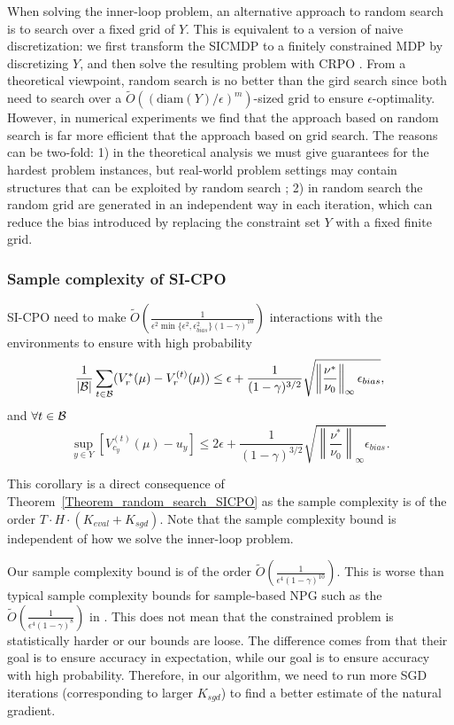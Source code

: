 \begin{remark}\label{Remark_random_search_vs_fixed_search}
    When solving the inner-loop problem, an alternative approach to random search is to search over a fixed grid of $Y$.
    This is equivalent to a version of naive discretization: we first transform the SICMDP to a finitely constrained MDP by discretizing $Y$, and then solve the resulting problem with CRPO \citep{xu2021crpo}.
    From a theoretical viewpoint, random search is no better than the gird search since both need to search over a $\widetilde{O}((\mathrm{diam}(Y)/\epsilon)^m)$-sized grid to ensure $\epsilon$-optimality.
    However, in numerical experiments we find that the approach based on random search is far more efficient that the approach based on grid search.
    The reasons can be two-fold: 1) in the theoretical analysis we must give guarantees for the hardest problem instances, but real-world problem settings may contain structures that can be exploited by random search \citep{bergstra2012random}; 2) in random search the random grid are generated in an independent way in each iteration, which can reduce the bias introduced by replacing the constraint set $Y$ with a fixed finite grid.
\end{remark}

\subsubsection{Sample complexity of SI-CPO}\label{Subsection_SICPO_Sample_Complexity}

\begin{corollary}\label{Corollary_Sample_Complexity_SICPO}
SI-CPO need to make $\widetilde O{\left(\frac{1}{\epsilon^2\min\{\epsilon^2,\epsilon_{bias}^2\}(1-\gamma)^{10}}\right)}$ interactions with the environments to ensure with high probability
$$
    \frac{1}{|{\mathcal{B}}|}\sum_{t\in{\mathcal{B}}}(V_r^*(\mu)-V_r^{(t)}(\mu))\leq \epsilon+\frac{1}{(1-\gamma)^{3/2}}\sqrt{\left\|\frac{\nu^*}{\nu_0}\right\|_\infty\epsilon_{bias}},
$$
and $\forall t\in{\mathcal{B}}$
$$ \sup_{y\in Y}\left[V_{c_y}^{(t)}(\mu)-u_y\right]\leq 2\epsilon+\frac{1}{(1-\gamma)^{3/2}}\sqrt{\left\|\frac{\nu^*}{\nu_0}\right\|_\infty\epsilon_{bias}}.
$$
\end{corollary}
This corollary is a direct consequence of Theorem~\ref{Theorem_random_search_SICPO} as the sample complexity is of the order $T \cdot H\cdot(K_{eval}+K_{sgd})$.
Note that the sample complexity bound is independent of how we solve the inner-loop problem.
\endproof

Our sample complexity bound is of the order $\widetilde{O}\left(\frac{1}{\epsilon^4(1-\gamma)^{10}}\right)$.
This is worse than typical sample complexity bounds for sample-based NPG such as the $\widetilde{O}\left(\frac{1}{\epsilon^4(1-\gamma)^8}\right)$ in \cite{agarwal2021theory}.
This does not mean that the constrained problem is statistically harder or our bounds are loose.
The difference comes from that their goal is to ensure accuracy in expectation, while our goal is to ensure accuracy with high probability.
Therefore, in our algorithm, we need to run more SGD iterations (corresponding to larger $K_{sgd}$) to find a better estimate of the natural gradient.